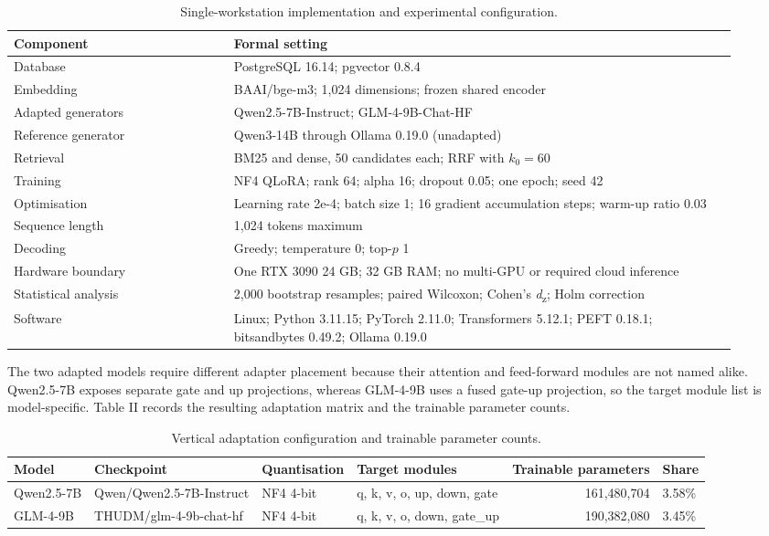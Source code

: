 \documentclass{article}
\begin{document}
\begin{table}[ht]
\centering
\caption{Single-workstation implementation and experimental configuration.}

\begin{tabular}{p{0.28\linewidth}p{0.64\linewidth}}
\toprule
Component & Formal setting \\
\midrule
Database & PostgreSQL 16.14; pgvector 0.8.4 \\
Embedding & BAAI/bge-m3; 1,024 dimensions; frozen shared encoder \\
Adapted generators & Qwen2.5-7B-Instruct; GLM-4-9B-Chat-HF \\
Reference generator & Qwen3-14B through Ollama 0.19.0 (unadapted) \\
Retrieval & BM25 and dense, 50 candidates each; RRF with $k_0=60$ \\
Training & NF4 QLoRA; rank 64; alpha 16; dropout 0.05; one epoch; seed 42 \\
Optimisation & Learning rate 2e-4; batch size 1; 16 gradient accumulation steps; warm-up ratio 0.03 \\
Sequence length & 1,024 tokens maximum \\
Decoding & Greedy; temperature 0; top-$p$ 1 \\
Hardware boundary & One RTX 3090 24 GB; 32 GB RAM; no multi-GPU or required cloud inference \\
Statistical analysis & 2,000 bootstrap resamples; paired Wilcoxon; Cohen's \emph{d}\textsubscript{z}; Holm correction \\
Software & Linux; Python 3.11.15; PyTorch 2.11.0; Transformers 5.12.1; PEFT 0.18.1; bitsandbytes 0.49.2; Ollama 0.19.0 \\
\bottomrule
\end{tabular}
\end{table}

The two adapted models require different adapter placement because their attention and feed-forward modules are not named alike. Qwen2.5-7B exposes separate gate and up projections, whereas GLM-4-9B uses a fused gate-up projection, so the target module list is model-specific. Table II records the resulting adaptation matrix and the trainable parameter counts.

\begin{table}[ht]
\centering
\caption{Vertical adaptation configuration and trainable parameter counts.}

\small
\begin{adjustbox}{max width=\linewidth}
\begin{tabular}{llllrl}
\toprule
Model & Checkpoint & Quantisation & Target modules & Trainable parameters & Share \\
\midrule
Qwen2.5-7B & Qwen/Qwen2.5-7B-Instruct & NF4 4-bit & q, k, v, o, up, down, gate & 161,480,704 & 3.58\% \\
GLM-4-9B & THUDM/glm-4-9b-chat-hf & NF4 4-bit & q, k, v, o, down, gate\_up & 190,382,080 & 3.45\% \\
\bottomrule
\end{tabular}
\end{adjustbox}
\end{table}
\end{document}

